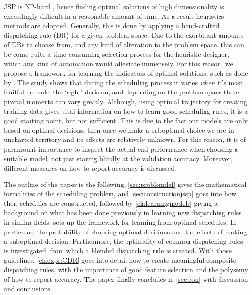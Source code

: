 \documentclass[smallextended]{svjour3}
\begin{document}
	JSP is NP-hard \cite{Garey76:NPhard}, hence finding optimal solutions of high dimensionality is exceedingly difficult in a reasonable amount of time. As a result heuristics methods are adopted. Generally, this is done by applying a hand-crafted dispatching rule (DR) for a given problem space. Due to the exorbitant amounts of DRs to choose from, and any kind of alteration to the problem space, this can be come quite a time-consuming selection process for the heuristic designer, which any kind of automation would alleviate immensely. 
	For this reason, we propose a framework for learning the indicators of optimal solutions, such as done by \cite{Siggi10}. 
	The study shows that during the scheduling process it varies \emph{when} it's most fruitful to make the `right' decision, and depending on the problem space those pivotal moments can vary greatly. 
	Although, using optimal trajectory for creating training data gives vital information on how to learn good scheduling rules, it is a good starting point, but not sufficient. This is due to the fact our models are only based on optimal decisions, then once we make a suboptimal choice we are in uncharted territory and its effects are relatively unknown. For this reason, it is of paramount importance to inspect the actual end-performance when choosing a suitable model, not just staring blindly at the validation accuracy. Moreover, different measures on how to report accuracy is discussed.
	
	The outline  of the paper is the following, \cref{sec:problemdef} gives the mathematical formalities of the scheduling problem, and \cref{sec:constructionjssp} goes into how their schedules are constructed, followed by \cref{ch:learningmodels} giving a background on what has been done previously in learning new dispatching rules in similar fields.  sets up the framework for learning from optimal schedules. In particular, the probability of choosing optimal decisions and the effects of making a suboptimal decision. Furthermore, the optimality of common dispatching rules is investigated, from which a blended dispatching rule is created. With those guidelines, \cref{ch:expr:CDR} goes into detail how to create meaningful composite dispatching rules, with the importance of good feature selection and the polysemy of how to report accuracy. The paper finally concludes in \cref{sec:con} with discussion and conclusions.
	
		
\end{document}
